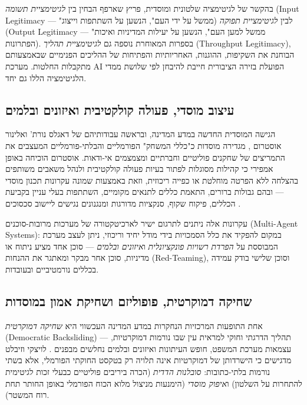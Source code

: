 בהקשר של לגיטימציה שלטונית ומוסדית, פריץ שארפף \cite{scharpf1999governing} הבחין בין \emph{לגיטימציית תשומה} (Input Legitimacy --- "ממשל על ידי העם", הנשען על השתתפות וייצוג) לבין \emph{לגיטימציית תפוקה} (Output Legitimacy --- "ממשל למען העם", הנשען על יעילות המדיניות ואיכות הפתרונות). בספרות המאוחרת נוספה גם \emph{לגיטימציית תהליך} (Throughput Legitimacy), הבוחנת את השקיפות, ההוגנות, האחריותיות והפתיחות של ההליכים הפנימיים שבאמצעותם מתקבלות החלטות. מערכת AI הפועלת בזירה הציבורית חייבת להיבחן לפי שלושת ממדי הלגיטימציה הללו גם יחד.

\subsection{עיצוב מוסדי, פעולה קולקטיבית ואיזונים ובלמים}
הגישה המוסדית החדשה במדע המדינה, ובראשה עבודותיהם של דאגלס נורת' \cite{north1990institutions} ואלינור אוסטרום \cite{ostrom1990governing}, מגדירה מוסדות כ"כללי המשחק" הפורמליים והבלתי-פורמליים המעצבים את התמריצים של שחקנים פוליטיים וחברתיים ומצמצמים אי-ודאות. אוסטרום הוכיחה באופן אמפירי כי קהילות מסוגלות לפתור בעיות פעולה קולקטיבית ולנהל משאבים משותפים בהצלחה ללא הפרטה מוחלטת או כפייה ריכוזית, וזאת באמצעות שמונה עקרונות תכנון מוסדי --- ובהם גבולות ברורים, התאמת כללים לתנאים מקומיים, השתתפות בעלי עניין בקביעת הכללים, פיקוח שקוף, סנקציות מדורגות ומנגנונים נגישים ליישוב סכסוכים \cite{ostrom1990governing}.

עקרונות אלה ניתנים לתרגום ישיר לארכיטקטורה של מערכות מרובות-סוכנים (Multi-Agent Systems): במקום להפקיד את כלל הסמכויות בידי מודל יחיד וריכוזי, ניתן לעצב מערכת המבוססת על \emph{הפרדת רשויות פונקציונלית} ו\emph{איזונים ובלמים} --- סוכן אחד מציע ניתוח או מדיניות, סוכן אחר מבקר ומאתגר את ההנחות (Red-Teaming), וסוכן שלישי בודק עמידה בכללים נורמטיביים ובעובדות.

\subsection{שחיקה דמוקרטית, פופוליזם ושחיקת אמון במוסדות}
אחת התופעות המרכזיות הנחקרות במדע המדינה העכשווי היא \emph{שחיקה דמוקרטית} (Democratic Backsliding) --- תהליך הדרגתי וחוקי למראית עין שבו נורמות דמוקרטיות, עצמאות מערכת המשפט, חופש העיתונות ואיזונים ובלמים נחלשים מבפנים \cite{levitsky2018how}. לויצקי וזיבלט מדגישים כי הישרדותן של דמוקרטיות אינה תלויה רק בטקסט החוקתי הפורמלי, אלא בשתי נורמות בלתי-כתובות: \emph{סובלנות הדדית} (הכרה ביריבים פוליטיים כבעלי זכות לגיטימית להתחרות על השלטון) ו\emph{איפוק מוסדי} (הימנעות מניצול מלוא הכוח הפורמלי באופן החותר תחת רוח המשטר).

